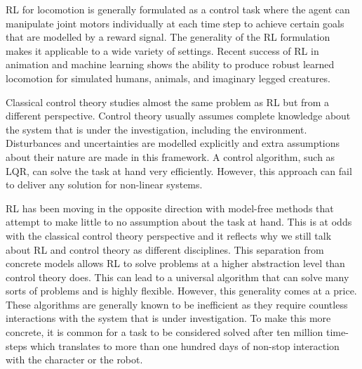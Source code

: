 %

\ac{RL} for locomotion is generally formulated as a control task where the agent can manipulate joint motors individually at each time step to achieve certain goals that are modelled by a reward signal. The generality of the \ac{RL} formulation makes it applicable to a wide variety of settings. Recent success of \ac{RL} in animation and machine learning shows the ability to produce robust learned locomotion for simulated humans, animals, and imaginary legged creatures.







Classical control theory studies almost the same problem as \ac{RL} but from a different perspective. Control theory usually assumes complete knowledge about the system that is under the investigation, including the environment.
Disturbances and uncertainties are modelled explicitly and extra assumptions about their nature are made in this framework. A control algorithm, such as LQR, can solve the task at hand  very efficiently.
However, this approach can fail to deliver any solution for non-linear systems.

\ac{RL} has been moving in the opposite direction with model-free methods that attempt to make little to no assumption about the task at hand.
This is at odds with the classical control theory perspective and it reflects why we still talk about \ac{RL} and control theory as different disciplines.
This separation from concrete models allows \ac{RL} to solve problems at a higher abstraction level than control theory does.
This can lead to a universal algorithm that can solve many sorts of problems and is highly flexible.
However, this generality comes at a price. These algorithms are generally known to be inefficient as they require countless interactions with the system that is under investigation.
To make this more concrete, it is common for a task to be considered solved after ten million time-steps which translates to more than one hundred days of non-stop interaction with the character or the robot.


